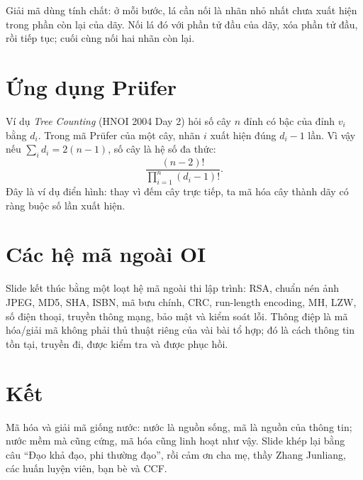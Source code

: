 \documentclass[11pt]{article}
\begin{document}
Giải mã dùng tính chất: ở mỗi bước, lá cần nối là nhãn nhỏ nhất chưa xuất hiện
trong phần còn lại của dãy. Nối lá đó với phần tử đầu của dãy, xóa phần tử
đầu, rồi tiếp tục; cuối cùng nối hai nhãn còn lại.

\section{Ứng dụng Prüfer}

Ví dụ \textit{Tree Counting} (HNOI 2004 Day 2) hỏi số cây \(n\) đỉnh có bậc
của đỉnh \(v_i\) bằng \(d_i\). Trong mã Prüfer của một cây, nhãn \(i\) xuất
hiện đúng \(d_i-1\) lần. Vì vậy nếu \(\sum_i d_i=2(n-1)\), số cây là hệ số đa
thức:
\[
  \frac{(n-2)!}{\prod_{i=1}^n (d_i-1)!}.
\]
Đây là ví dụ điển hình: thay vì đếm cây trực tiếp, ta mã hóa cây thành dãy có
ràng buộc số lần xuất hiện.

\section{Các hệ mã ngoài OI}

Slide kết thúc bằng một loạt hệ mã ngoài thi lập trình: RSA, chuẩn nén ảnh
JPEG, MD5, SHA, ISBN, mã bưu chính, CRC, run-length encoding, MH, LZW, số điện
thoại, truyền thông mạng, bảo mật và kiểm soát lỗi. Thông điệp là mã hóa/giải
mã không phải thủ thuật riêng của vài bài tổ hợp; đó là cách thông tin tồn tại,
truyền đi, được kiểm tra và được phục hồi.

\section{Kết}

Mã hóa và giải mã giống nước: nước là nguồn sống, mã là nguồn của thông tin;
nước mềm mà cũng cứng, mã hóa cũng linh hoạt như vậy. Slide khép lại bằng câu
``Đạo khả đạo, phi thường đạo'', rồi cảm ơn cha mẹ, thầy Zhang Junliang, các
huấn luyện viên, bạn bè và CCF.
\end{document}
